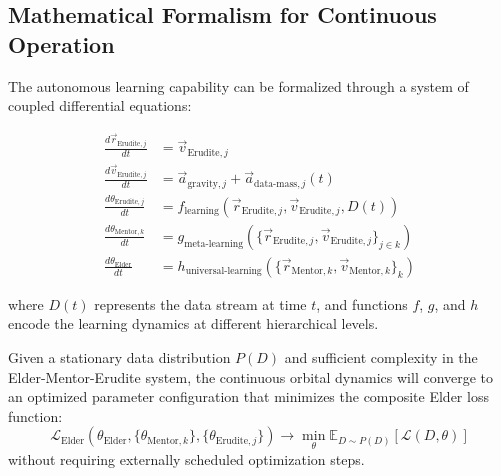 \subsection{Mathematical Formalism for Continuous Operation}

The autonomous learning capability can be formalized through a system of coupled differential equations:

\begin{align}
\frac{d\vec{r}_{\text{Erudite},j}}{dt} &= \vec{v}_{\text{Erudite},j} \\
\frac{d\vec{v}_{\text{Erudite},j}}{dt} &= \vec{a}_{\text{gravity},j} + \vec{a}_{\text{data-mass},j}(t) \\
\frac{d\theta_{\text{Erudite},j}}{dt} &= f_{\text{learning}}(\vec{r}_{\text{Erudite},j}, \vec{v}_{\text{Erudite},j}, D(t)) \\
\frac{d\theta_{\text{Mentor},k}}{dt} &= g_{\text{meta-learning}}(\{\vec{r}_{\text{Erudite},j}, \vec{v}_{\text{Erudite},j}\}_{j \in k}) \\
\frac{d\theta_{\text{Elder}}}{dt} &= h_{\text{universal-learning}}(\{\vec{r}_{\text{Mentor},k}, \vec{v}_{\text{Mentor},k}\}_k)
\end{align}

where $D(t)$ represents the data stream at time $t$, and functions $f$, $g$, and $h$ encode the learning dynamics at different hierarchical levels.

\begin{theorem}
Given a stationary data distribution $P(D)$ and sufficient complexity in the Elder-Mentor-Erudite system, the continuous orbital dynamics will converge to an optimized parameter configuration that minimizes the composite Elder loss function:
\begin{equation}
\mathcal{L}_{\text{Elder}}(\theta_{\text{Elder}}, \{\theta_{\text{Mentor},k}\}, \{\theta_{\text{Erudite},j}\}) \to \min_{\theta} \mathbb{E}_{D \sim P(D)}[\mathcal{L}(D, \theta)]
\end{equation}
without requiring externally scheduled optimization steps.
\end{theorem}

